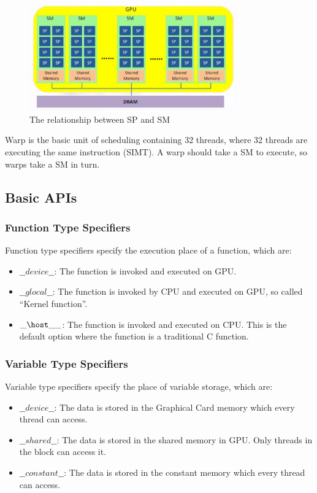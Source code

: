 \documentclass[11pt]{article}
\begin{document}
\begin{figure}[h]
    \centering
    \includegraphics[width=0.8\textwidth]{spsm.eps}
    \caption{The relationship between SP and SM}
    \label{fig:spsm}
\end{figure}

Warp is the basic unit of scheduling containing 32 threads, where 32 threads are executing the same instruction (SIMT). A warp should take a SM to execute, so warps take a SM in turn.

\subsection{Basic APIs}

\subsubsection{Function Type Specifiers}

Function type specifiers specify the execution place of a function, which are:

\begin{itemize}
\item $\_\_device\_\_$: The function is invoked and executed on GPU.
\item $\_\_glocal\_\_$: The function is invoked by CPU and executed on GPU, so called ``Kernel function''.
\item $\_\host\_\_$: The function is invoked and executed on CPU. This is the default option where the function is a traditional C function.
\end{itemize}

\subsubsection{Variable Type Specifiers}

Variable type specifiers specify the place of variable storage, which are:

\begin{itemize}
\item $\_\_device\_\_$: The data is stored in the Graphical Card memory which every thread can access.
\item $\_\_shared\_\_$: The data is stored in the shared memory in GPU. Only threads in the block can access it.
\item $\_\_constant\_\_$: The data is stored in the constant memory which every thread can access.
\end{itemize}
\end{document}
